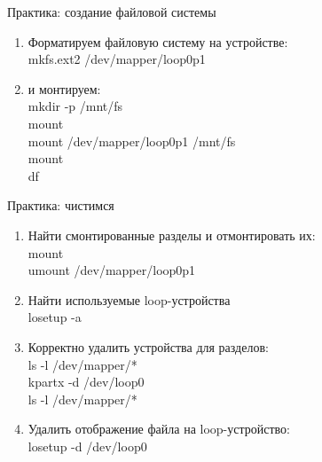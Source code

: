 \begin{frame}{Практика: создание файловой системы}
	\begin{enumerate}
		\item Форматируем файловую систему на устройстве: \\
			mkfs.ext2 /dev/mapper/loop0p1
			\pause
		\item и монтируем:\\
			mkdir -p /mnt/fs\\
			mount\\
			mount /dev/mapper/loop0p1 /mnt/fs\\
			mount\\
			df
			\pause
	\end{enumerate}
\end{frame}


\begin{frame}{Практика: чистимся}
	\begin{enumerate}
		\item Найти смонтированные разделы и отмонтировать их: \\
			mount \\
			umount /dev/mapper/loop0p1
			\pause
		\item Найти используемые loop-устройства\\
			losetup -a \\
			\pause
		\item Корректно удалить устройства для разделов:\\
			ls -l /dev/mapper/* \\
			kpartx -d /dev/loop0 \\
			ls -l /dev/mapper/* \\
			\pause
		\item Удалить отображение файла на loop-устройство: \\
			losetup -d /dev/loop0
	\end{enumerate}
\end{frame}



